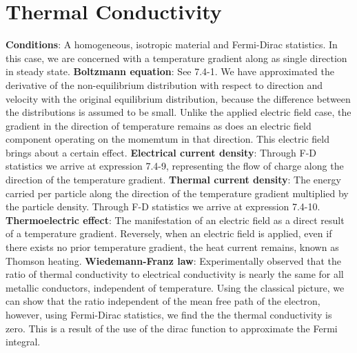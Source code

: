 \documentclass{article}
\numberwithin{equation}{section}
\begin{document}
\section*{Thermal Conductivity}
\textbf{Conditions}: A homogeneous, isotropic material and Fermi-Dirac statistics. In this case, we are concerned with a temperature gradient along as single direction in steady state.
\newline
\textbf{Boltzmann equation}: See 7.4-1. We have approximated the derivative of the non-equilibrium distribution with respect to direction and velocity with the original equilibrium distribution, because the difference between the distributions is assumed to be small. Unlike the applied electric field case, the gradient in the direction of temperature remains as does an electric field component operating on the momemtum in that direction. This electric field brings about a certain effect.
\newline
\textbf{Electrical current density}: Through F-D statistics we arrive at expression 7.4-9, representing the flow of charge along the direction of the temperature gradient.
\newline
\textbf{Thermal current density}: The energy carried per particle along the direction of the temperature gradient multiplied by the particle density. Through F-D statistics we arrive at expression 7.4-10.
\newline
\textbf{Thermoelectric effect}: The manifestation of an electric field as a direct result of a temperature gradient. Reversely, when an electric field is applied, even if there exists no prior temperature gradient, the heat current remains, known as Thomson heating. 
\newline
\textbf{Wiedemann-Franz law}: Experimentally observed that the ratio of thermal conductivity to electrical conductivity is nearly the same for all metallic conductors, independent of temperature. Using the classical picture, we can show that the ratio independent of the mean free path of the electron, however, using Fermi-Dirac statistics, we find the the thermal conductivity is zero. This is a result of the use of the dirac function to approximate the Fermi integral.
\end{document}

